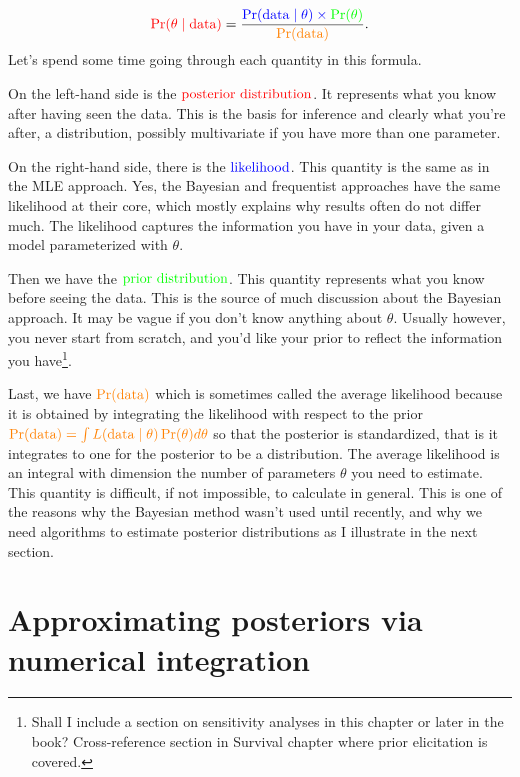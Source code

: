 \documentclass[
  12pt,
]{krantz}
\begin{document}
\[{\color{red}{\Pr(\theta \mid \text{data})}} = \frac{\color{blue}{\Pr(\text{data} \mid \theta)} \times \color{green}{\Pr(\theta)}}{\color{orange}{\Pr(\text{data})}}.\]
Let's spend some time going through each quantity in this formula.

On the left-hand side is the \(\color{red}{\text{posterior distribution}}\). It represents what you know after having seen the data. This is the basis for inference and clearly what you're after, a distribution, possibly multivariate if you have more than one parameter.

On the right-hand side, there is the \(\color{blue}{\text{likelihood}}\). This quantity is the same as in the MLE approach. Yes, the Bayesian and frequentist approaches have the same likelihood at their core, which mostly explains why results often do not differ much. The likelihood captures the information you have in your data, given a model parameterized with \(\theta\).

Then we have the \(\color{green}{\text{prior distribution}}\). This quantity represents what you know before seeing the data. This is the source of much discussion about the Bayesian approach. It may be vague if you don't know anything about \(\theta\). Usually however, you never start from scratch, and you'd like your prior to reflect the information you have\footnote{Shall I include a section on sensitivity analyses in this chapter or later in the book? Cross-reference section in Survival chapter where prior elicitation is covered.}.

Last, we have \(\color{orange}{\Pr(\text{data})}\) which is sometimes called the average likelihood because it is obtained by integrating the likelihood with respect to the prior \(\color{orange}{\Pr(\text{data}) = \int{L(\text{data} \mid \theta)\Pr(\theta) d\theta}}\) so that the posterior is standardized, that is it integrates to one for the posterior to be a distribution. The average likelihood is an integral with dimension the number of parameters \(\theta\) you need to estimate. This quantity is difficult, if not impossible, to calculate in general. This is one of the reasons why the Bayesian method wasn't used until recently, and why we need algorithms to estimate posterior distributions as I illustrate in the next section.

\hypertarget{numerical-approx}{%
\section{Approximating posteriors via numerical integration}\label{numerical-approx}}
\end{document}
